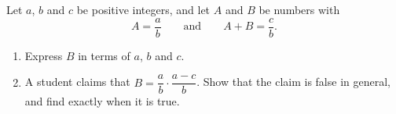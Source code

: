 Let $a$, $b$ and $c$ be positive integers, and let $A$ and $B$ be numbers with
\[A=\dfrac ab\qquad\text{and}\qquad A+B=\dfrac cb.\]
\begin{enumerate}
\item[(a)] Express $B$ in terms of $a$, $b$ and $c$.
\item[(b)] A student claims that $B=\dfrac ab\cdot\dfrac{a-c}{b}$. Show that the claim is false in general, and find exactly when it is true.
\end{enumerate}
